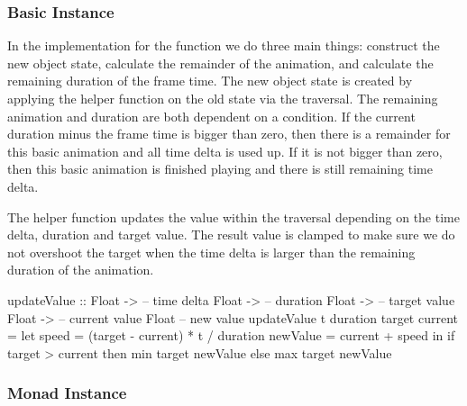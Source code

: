 \subsubsection{Basic Instance}

In the implementation for the  function we do three main things: construct the new object state, calculate the remainder of the animation, and calculate the remaining duration of the frame time. The new object state is created by applying the helper function  on the old state via the traversal. The remaining animation and duration are both dependent on a condition. If the current duration minus the frame time is bigger than zero, then there is a remainder for this basic animation and all time delta is used up. If it is not bigger than zero, then this basic animation is finished playing and there is still remaining time delta.


The  helper function updates the value within the traversal depending on the time delta, duration and target value. The result value is clamped to make sure we do not overshoot the target when the time delta is larger than the remaining duration of the animation.

\begin{code}
updateValue ::
  Float -> -- time delta
  Float -> -- duration
  Float -> -- target value
  Float -> -- current value
  Float -- new value
updateValue t duration target current = let
  speed = (target - current) * t / duration
  newValue = current + speed
  in if target > current
    then min target newValue
    else max target newValue
\end{code}

\subsubsection{Monad Instance}

